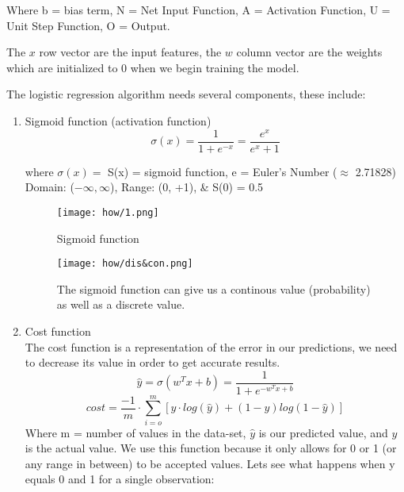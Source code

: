 \documentclass[notitlepage,a4paper,oneside,article,table]{article}
\begin{document}
\begin{center}
    Where b = bias term, N = Net Input Function, A = Activation Function, U = Unit Step Function, O = Output.
\end{center}

The $x$ row vector are the input features, the $w$ column vector are the weights which are initialized to 0 when we begin training the model.


\vspace{0.5cm}
The logistic regression algorithm needs several components, these include:

\begin{enumerate}
    \item Sigmoid function (activation function)\\

    $$\sigma(x) = \frac{1}{1 + e^{-x}} = \frac{e^{x}}{e^{x} + 1}$$
\begin{center}
    where $\sigma(x) =$ S(x) =  sigmoid function, e = Euler's Number ($\approx$ 2.71828)\\
Domain: ($-\infty, \infty$), Range: (0, +1), \& S(0) = 0.5    
\end{center}

\begin{figure}[h] %
    \centering
    \texttt{[image: how/1.png]}
    \caption{Sigmoid function}
\end{figure}
\FloatBarrier

\begin{figure}[h] %
    \centering
    \texttt{[image: how/dis\&con.png]}
    \caption{The sigmoid function can give us a continous value (probability) as well as a discrete value.}
\end{figure}
\FloatBarrier

    \item Cost function\\
    The cost function is a representation of the error in our predictions, we need to decrease its value in order to get accurate results. 
    $$\hat{y} = \sigma(w^{T}x+b) = \frac{1}{1+e^{-w^{T}x+b}}$$
    $$cost = \frac{-1}{m} \cdot \sum_{i=o}^{m} [y \cdot log(\hat{y}) + (1 - y)log(1-\hat{y})]$$
    Where m = number of values in the data-set, $\hat{y}$ is our predicted value, and $y$ is the actual value. We use this function because it only allows for 0 or 1 (or any range in between) to be accepted values. Lets see what happens when y equals 0 and 1 for a single observation:


\end{enumerate}
\end{document}

